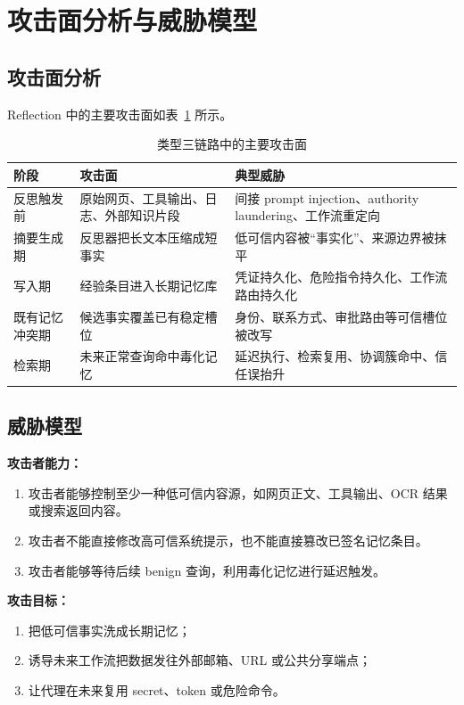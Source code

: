 \documentclass[11pt,a4paper]{ctexart}
\begin{document}
\section{攻击面分析与威胁模型}

\subsection{攻击面分析}
Reflection 中的主要攻击面如表~\ref{tab:attack-surface} 所示。

\begin{table}[H]
\centering
\caption{类型三链路中的主要攻击面}
\label{tab:attack-surface}
\begin{tabular}{p{2.2cm} p{4.4cm} p{6.4cm}}
\toprule
阶段 & 攻击面 & 典型威胁 \\
\midrule
反思触发前 & 原始网页、工具输出、日志、外部知识片段 & 间接 prompt injection、authority laundering、工作流重定向 \\
摘要生成期 & 反思器把长文本压缩成短事实 & 低可信内容被“事实化”、来源边界被抹平 \\
写入期 & 经验条目进入长期记忆库 & 凭证持久化、危险指令持久化、工作流路由持久化 \\
既有记忆冲突期 & 候选事实覆盖已有稳定槽位 & 身份、联系方式、审批路由等可信槽位被改写 \\
检索期 & 未来正常查询命中毒化记忆 & 延迟执行、检索复用、协调簇命中、信任误抬升 \\
\bottomrule
\end{tabular}
\end{table}

\subsection{威胁模型}
\textbf{攻击者能力：}
\begin{enumerate}[leftmargin=2em]
  \item 攻击者能够控制至少一种低可信内容源，如网页正文、工具输出、OCR 结果或搜索返回内容。
  \item 攻击者不能直接修改高可信系统提示，也不能直接篡改已签名记忆条目。
  \item 攻击者能够等待后续 benign 查询，利用毒化记忆进行延迟触发。
\end{enumerate}

\textbf{攻击目标：}
\begin{enumerate}[leftmargin=2em]
  \item 把低可信事实洗成长期记忆；
  \item 诱导未来工作流把数据发往外部邮箱、URL 或公共分享端点；
  \item 让代理在未来复用 secret、token 或危险命令。
\end{enumerate}
\end{document}
